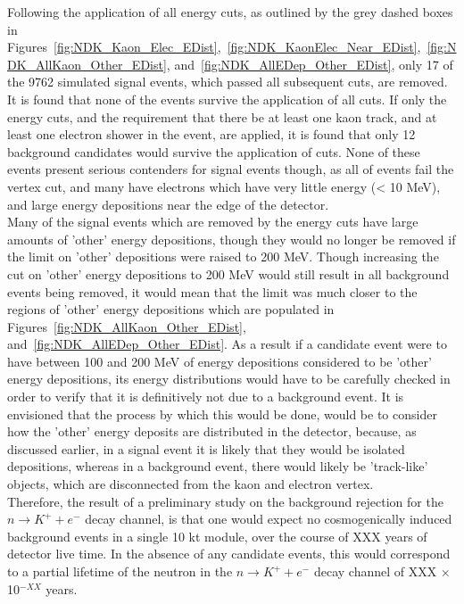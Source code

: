 Following the application of all energy cuts, as outlined by the grey dashed boxes in Figures~\ref{fig:NDK_Kaon_Elec_EDist},~\ref{fig:NDK_KaonElec_Near_EDist},~\ref{fig:NDK_AllKaon_Other_EDist}, and~\ref{fig:NDK_AllEDep_Other_EDist}, only 17 of the 9762 simulated signal events, which passed all subsequent cuts, are removed. It is found that none of the events survive the application of all cuts. If only the energy cuts, and the requirement that there be at least one kaon track, and at least one electron shower in the event, are applied, it is found that only 12 background candidates would survive the application of cuts. None of these events present serious contenders for signal events though, as all of events fail the vertex cut, and many have electrons which have very little energy (< 10 MeV), and large energy depositions near the edge of the detector. \\

Many of the signal events which are removed by the energy cuts have large amounts of 'other' energy depositions, though they would no longer be removed if the limit on 'other' depositions were raised to 200 MeV. Though increasing the cut on 'other' energy depositions to 200 MeV would still result in all background events being removed, it would mean that the limit was much closer to the regions of 'other' energy depositions which are populated in Figures~\ref{fig:NDK_AllKaon_Other_EDist}, and~\ref{fig:NDK_AllEDep_Other_EDist}. As a result if a candidate event were to have between 100 and 200 MeV of energy depositions considered to be 'other' energy depositions, its energy distributions would have to be carefully checked in order to verify that it is definitively not due to a background event. It is envisioned that the process by which this would be done, would be to consider how the 'other' energy deposits are distributed in the detector, because, as discussed earlier, in a signal event it is likely that they would be isolated depositions, whereas in a background event, there would likely be 'track-like' objects, which are disconnected from the kaon and electron vertex. \\

Therefore, the result of a preliminary study on the background rejection for the $n \rightarrow K^{+} + e^{-}$ decay channel, is that one would expect no cosmogenically induced background events in a single 10 kt module, over the course of XXX years of detector live time. In the absence of any candidate events, this would correspond to a partial lifetime of the neutron in the $n \rightarrow K^{+} + e^{-}$ decay channel of XXX $\times$ 10$^{-XX}$ years. \\

